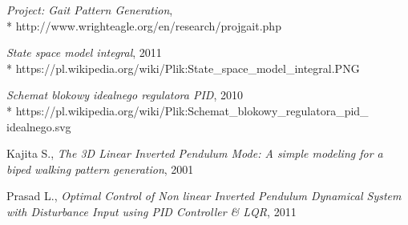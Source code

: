 \documentclass[12pt, oneside]{report}
\theoremstyle{definition}
\begin{document}
\begin{thebibliography}{11}
  \emph{Project: Gait Pattern Generation},
\\*
http://www.wrighteagle.org/en/research/projgait.php

 \emph{State space model integral}, 2011
\\*
https://pl.wikipedia.org/wiki/Plik:State\_space\_model\_integral.PNG

 \emph{Schemat blokowy idealnego regulatora PID}, 2010
\\*
https://pl.wikipedia.org/wiki/Plik:Schemat\_blokowy\_regulatora\_pid\_\\idealnego.svg

 Kajita S., \emph{The 3D Linear Inverted Pendulum Mode: A simple modeling for a biped walking pattern generation}, 2001

 Prasad L., \emph{Optimal Control of Non linear Inverted Pendulum Dynamical System with Disturbance Input using PID Controller \& LQR}, 2011

\end{thebibliography}
\end{document}
